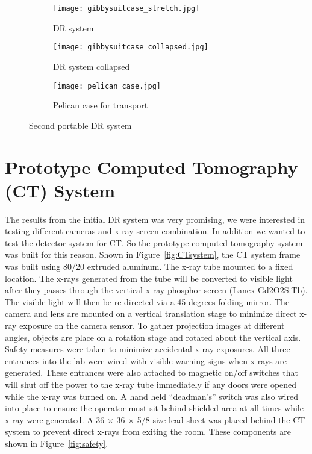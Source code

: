 \begin{figure}
	\begin{subfigure}[b]{0.3\linewidth}
	\centering
	\texttt{[image: gibbysuitcase\_stretch.jpg]}
	\caption{DR system}
	\label{DR2stretched}
	\end{subfigure}
\hspace{0.2cm}
	\begin{subfigure}[b]{0.3\linewidth}
	\centering
	\texttt{[image: gibbysuitcase\_collapsed.jpg]}
	\caption{DR system collapsed}
	\label{fig:DR2collapsed}
	\end{subfigure}
\hspace{0.2cm}	
	\begin{subfigure}[b]{0.3\linewidth}
	\centering
	\texttt{[image: pelican\_case.jpg]}
	\caption{Pelican case for transport}
	\label{fig:pelicancase}
	\end{subfigure}
\caption{Second portable DR system}
\label{fig:DR2}	
\end{figure}
	
\section{Prototype Computed Tomography (CT) System}
The results from the initial DR system was very promising, we were interested in testing different cameras and x-ray screen combination.  In addition we wanted to test the detector system for CT.  So the prototype computed tomography system was built for this reason.  Shown in Figure~\ref{fig:CTsystem}, the CT system frame was built using 80/20 extruded aluminum.  The x-ray tube mounted to a fixed location.  The x-rays generated from the tube will be converted to visible light after they passes through the vertical x-ray phosphor screen (Lanex Gd2O2S:Tb).  The visible light will then be re-directed via a 45 degrees folding mirror.  The camera and lens are mounted on a vertical translation stage to minimize direct x-ray exposure on the camera sensor.  To gather projection images at different angles, objects are place on a rotation stage and rotated about the vertical axis.  Safety measures were taken to minimize accidental x-ray exposures.  All three entrances into the lab were wired with visible warning signs when x-rays are generated.  These entrances were also attached to magnetic on/off switches that will shut off the power to the x-ray tube immediately if any doors were opened while the x-ray was turned on.  A hand held ``deadman's'' switch was also wired into place to ensure the operator must sit behind shielded area at all times while x-ray were generated.  A 36 \inches $\times$ 36 \inches $\times$ 5/8 \inches size lead sheet was placed behind the CT system to prevent direct x-rays from exiting the room.  These components are shown in Figure~\ref{fig:safety}.

